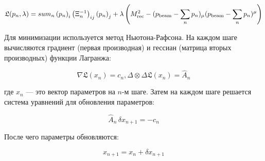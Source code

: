 \begin{equation}
    \mathfrak{L}(p_n, \lambda) = 
    sum_n \left( p_{n} \right)_i  \left( \Xi_n^{-1} \right)_{ij}  \left( p_{n} \right)_j + 
    \lambda \left( M_{\text{rec}}^2 - (p_{\text{beam}} - \sum_n p_n)_\mu (p_{\text{beam}} - \sum_n p_n)^\mu \right)
\end{equation}

Для минимизации используется метод Ньютона-Рафсона. На каждом шаге вычисляются градиент (первая производная) и гессиан (матрица вторых производных) функции Лагранжа:

\begin{equation}
    \nabla \mathfrak{L}(x_n) = c_n, \Delta \otimes \Delta \mathfrak{L}(x_n)  = \hat{A}_n
\end{equation}

где $x_n$ — это вектор параметров на $n$-м шаге. Затем на каждом шаге решается система уравнений для обновления параметров:

\begin{equation}
    \hat{A}_n \, \delta x_{n+1} = -c_n
\end{equation}

После чего параметры обновляются:

\begin{equation}
    x_{n+1} = x_n + \delta x_{n+1}
\end{equation}



